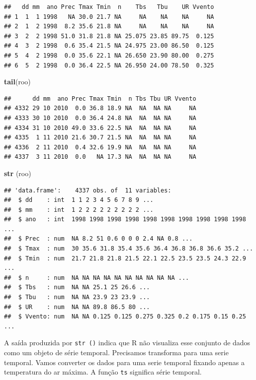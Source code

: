 \documentclass[
]{book}
\newenvironment{Shaded}{\begin{snugshade}}{\end{snugshade}}
\newcommand{\KeywordTok}[1]{\textcolor[rgb]{0.13,0.29,0.53}{\textbf{#1}}}
\newcommand{\NormalTok}[1]{#1}
\begin{document}
\begin{verbatim}
##   dd mm  ano Prec Tmax Tmin  n    Tbs   Tbu    UR Vvento
## 1  1  1 1998   NA 30.0 21.7 NA     NA    NA    NA     NA
## 2  1  2 1998  8.2 35.6 21.8 NA     NA    NA    NA     NA
## 3  2  2 1998 51.0 31.8 21.8 NA 25.075 23.85 89.75  0.125
## 4  3  2 1998  0.6 35.4 21.5 NA 24.975 23.00 86.50  0.125
## 5  4  2 1998  0.0 35.6 22.1 NA 26.650 23.90 80.00  0.275
## 6  5  2 1998  0.0 36.4 22.5 NA 26.950 24.00 78.50  0.325
\end{verbatim}

\begin{Shaded}
\begin{Highlighting}[]
\KeywordTok{tail}\NormalTok{(roo)}
\end{Highlighting}
\end{Shaded}

\begin{verbatim}
##      dd mm  ano Prec Tmax Tmin  n Tbs Tbu UR Vvento
## 4332 29 10 2010  0.0 36.8 18.9 NA  NA  NA NA     NA
## 4333 30 10 2010  0.0 36.4 24.8 NA  NA  NA NA     NA
## 4334 31 10 2010 49.0 33.6 22.5 NA  NA  NA NA     NA
## 4335  1 11 2010 21.6 30.7 21.5 NA  NA  NA NA     NA
## 4336  2 11 2010  0.4 32.6 19.9 NA  NA  NA NA     NA
## 4337  3 11 2010  0.0   NA 17.3 NA  NA  NA NA     NA
\end{verbatim}

\begin{Shaded}
\begin{Highlighting}[]
\KeywordTok{str}\NormalTok{ (roo)}
\end{Highlighting}
\end{Shaded}

\begin{verbatim}
## 'data.frame':    4337 obs. of  11 variables:
##  $ dd    : int  1 1 2 3 4 5 6 7 8 9 ...
##  $ mm    : int  1 2 2 2 2 2 2 2 2 2 ...
##  $ ano   : int  1998 1998 1998 1998 1998 1998 1998 1998 1998 1998 ...
##  $ Prec  : num  NA 8.2 51 0.6 0 0 0 2.4 NA 0.8 ...
##  $ Tmax  : num  30 35.6 31.8 35.4 35.6 36.4 36.8 36.8 36.6 35.2 ...
##  $ Tmin  : num  21.7 21.8 21.8 21.5 22.1 22.5 23.5 23.5 24.3 22.9 ...
##  $ n     : num  NA NA NA NA NA NA NA NA NA NA ...
##  $ Tbs   : num  NA NA 25.1 25 26.6 ...
##  $ Tbu   : num  NA NA 23.9 23 23.9 ...
##  $ UR    : num  NA NA 89.8 86.5 80 ...
##  $ Vvento: num  NA NA 0.125 0.125 0.275 0.325 0.2 0.175 0.15 0.25 ...
\end{verbatim}

A saída produzida por \texttt{str\ ()} indica que R não visualiza esse conjunto de dados como um objeto de série temporal. Precisamos transforma para uma serie temporal.
Vamos converter os dados para uma serie temporal fixando apenas a temperatura do ar máxima. A função \texttt{ts} significa série temporal.
\end{document}
